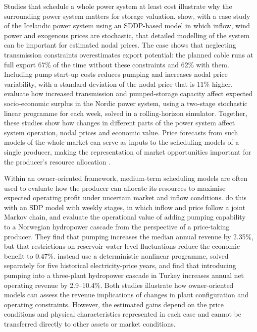 Studies that schedule a whole power system at least cost illustrate why the surrounding power system matters for storage valuation. \textcite{helseth2013} show, with a case study of the Icelandic power system using an SDDP-based model in which inflow, wind power and exogenous prices are stochastic, that detailed modelling of the system can be important for estimated nodal prices. The case shows that neglecting transmission constraints overestimates export potential: the planned cable runs at full export 67\% of the time without these constraints and 62\% with them. Including pump start-up costs reduces pumping and increases nodal price variability, with a standard deviation of the nodal price that is 11\% higher. \textcite{helseth2017} evaluate how increased transmission and pumped-storage capacity affect expected socio-economic surplus in the Nordic power system, using a two-stage stochastic linear programme for each week, solved in a rolling-horizon simulator. Together, these studies show how changes in different parts of the power system affect system operation, nodal prices and economic value. Price forecasts from such models of the whole market can serve as inputs to the scheduling models of a single producer, making the representation of market opportunities important for the producer’s resource allocation \parencite{helseth2020scheduling}.

Within an owner-oriented framework, medium-term scheduling models are often used to evaluate how the producer can allocate its resources to maximise expected operating profit under uncertain market and inflow conditions. \textcite{alic2023} do this with an SDP model with weekly stages, in which inflow and price follow a joint Markov chain, and evaluate the operational value of adding pumping capability to a Norwegian hydropower cascade from the perspective of a price-taking producer. They find that pumping increases the median annual revenue by 2.35\%, but that restrictions on reservoir water-level fluctuations reduce the economic benefit to 0.47\%. \textcite{ak2019} instead use a deterministic nonlinear programme, solved separately for five historical electricity-price years, and find that introducing pumping into a three-plant hydropower cascade in Turkey increases annual net operating revenue by 2.9--10.4\%. Both studies illustrate how owner-oriented models can assess the revenue implications of changes in plant configuration and operating constraints. However, the estimated gains depend on the price conditions and physical characteristics represented in each case and cannot be transferred directly to other assets or market conditions.

